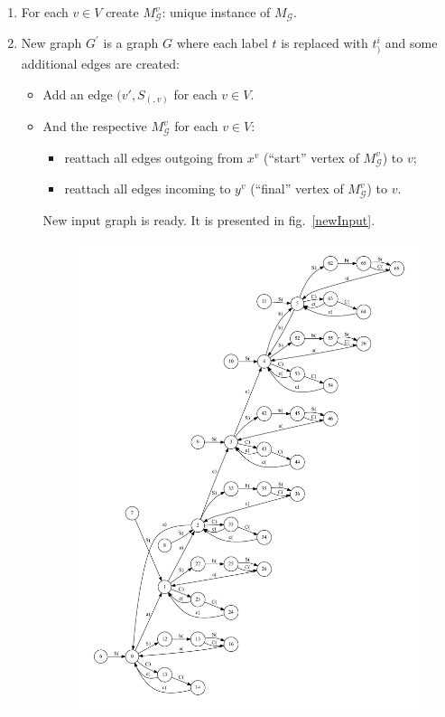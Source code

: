 \begin{enumerate}
\item For each $v \in V$ create $M_{\mathcal{G}}^v$: unique instance of $M_{\mathcal{G}}$.
\item New graph $G^{'}$ is a graph $G$ where each label $t$ is replaced with $t_{)}^i$ and some additional edges are created:
\begin{itemize}
\item Add an edge $(v', S_(, v)$ for each $v \in V$. 
\item And the respective $M_{\mathcal{G}}^v$ for each $v \in V$:
  \begin{itemize}
    \item reattach all edges outgoing from $x^v$ (``start'' vertex of $M_{\mathcal{G}}^v$) to $v$;
    \item reattach all edges incoming to $y^v$ (``final'' vertex of $M_{\mathcal{G}}^v$) to $v$.    
  \end{itemize}
  New input graph is ready. It is presented in fig.~\ref{newInput}.

\begin{figure}  
  \includegraphics[width=.9\textwidth]{dot/input_new_min.pdf}
 

\end{figure}
\end{itemize}
\end{enumerate}
